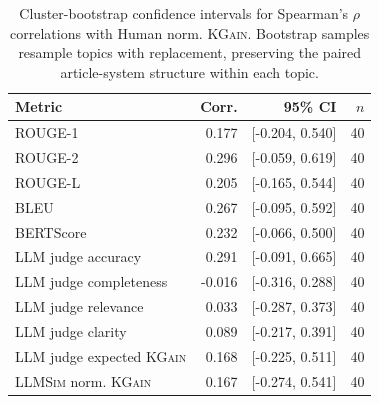 \begin{table}[t]
\centering
\small
\setlength{\tabcolsep}{4pt}
\begin{tabular}{lrrr}
\toprule
Metric & Corr. & 95\% CI & $n$ \\
\midrule
ROUGE-1 & 0.177 & [-0.204, 0.540] & 40 \\
ROUGE-2 & 0.296 & [-0.059, 0.619] & 40 \\
ROUGE-L & 0.205 & [-0.165, 0.544] & 40 \\
BLEU & 0.267 & [-0.095, 0.592] & 40 \\
BERTScore & 0.232 & [-0.066, 0.500] & 40 \\
LLM judge accuracy & 0.291 & [-0.091, 0.665] & 40 \\
LLM judge completeness & -0.016 & [-0.316, 0.288] & 40 \\
LLM judge relevance & 0.033 & [-0.287, 0.373] & 40 \\
LLM judge clarity & 0.089 & [-0.217, 0.391] & 40 \\
LLM judge expected \textsc{KGain} & 0.168 & [-0.225, 0.511] & 40 \\
\textsc{LLMSim} norm. \textsc{KGain} & 0.167 & [-0.274, 0.541] & 40 \\
\bottomrule
\end{tabular}
\caption{Cluster-bootstrap confidence intervals for Spearman's $\rho$ correlations with Human norm. \textsc{KGain}. Bootstrap samples resample topics with replacement, preserving the paired article-system structure within each topic.}
\label{tab:metrics_vs_kgain_bootstrap_ci}
\end{table}
